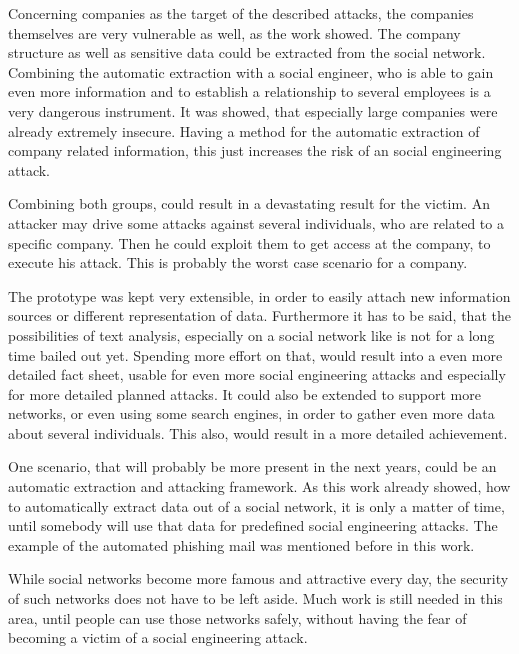 Concerning companies as the target of the described attacks, the companies
themselves are very vulnerable as well, as the work showed. The company
structure as well as sensitive data could be extracted from the social network.
Combining the automatic extraction with a social engineer, who is able to gain
even more information and to establish a relationship to several employees is a
very dangerous instrument. It was showed, that especially large companies were
already extremely insecure. Having a method for the automatic extraction of
company related information, this just increases the risk of an social
engineering attack.

Combining both groups, could result in a devastating result for the victim. An
attacker may drive some attacks against several individuals, who are related to a
specific company. Then he could exploit them to get access at the company, to
execute his attack. This is probably the worst case scenario for a company.

The prototype was kept very extensible, in order to easily attach new
information sources or different representation of data. Furthermore it has to
be said, that the possibilities of text analysis, especially on a social
network like \Twitter{} is not for a long time bailed out yet. Spending more
effort on that, would result into a even more detailed fact sheet, usable for
even more social engineering attacks and especially for more detailed planned
attacks. It could also be extended to support more networks, or even using
some search engines, in order to gather even more data about several
individuals. This also, would result in a more detailed achievement.

One scenario, that will probably be more present in the next years, could be an
automatic extraction and attacking framework. As this work already showed, how
to automatically extract data out of a social network, it is only a matter of
time, until somebody will use that data for predefined social engineering
attacks. The example of the automated phishing mail was mentioned before in
this work.

While social networks become more famous and attractive every day, the security
of such networks does not have to be left aside. Much work is still needed in
this area, until people can use those networks safely, without having the fear
of becoming a victim of a social engineering attack.
